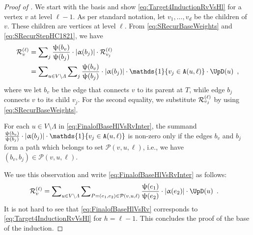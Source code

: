 \documentclass[11pt,reqno]{amsart}
\numberwithin{equation}{section}
\newcommand{\cP}{{\mathcal{P}}}
\newcommand{\applegreen}[1]{ {\color{applegreen}#1}}
\newcommand{\blue}[1]{{\color{blue}#1}}
\newcommand{\cadmiumorange}[1]{{\color{cadmiumorange}#1}}
\newcommand{\coquelicot}[1]{{\color{coquelicot}#1}}
\newcommand{\deeppink}[1]{{\color{deeppink}#1}}
\newcommand{\electricviolet}[1]{{\color{electricviolet}#1}}
\newcommand{\goldenbrown}[1]{{\color{goldenbrown}#1}}
\newcommand{\red}[1]{{\color{red}#1}}
\newcommand{\Ind}{\mathds{1}}
\newcommand{\cp}{{\tt A}}
\newcommand{\abs}[1]{\blue{|}#1\blue{|}}
\renewcommand{\applegreen}[1]{#1}
\renewcommand{\blue}[1]{#1}
\renewcommand{\cadmiumorange}[1]{#1}
\renewcommand{\coquelicot}[1]{#1}
\renewcommand{\deeppink}[1]{#1}
\renewcommand{\electricviolet}[1]{#1}
\renewcommand{\goldenbrown}[1]{#1}
\renewcommand{\red}[1]{#1}
\newcommand{\kb}{\deeppink{b}}
\newcommand{\ke}{\blue{e}}
\newcommand{\kh}{\cadmiumorange{h}}
\newcommand{\kj}{\coquelicot{j}}
\newcommand{\kell}{{\color{green(pigment)}\ell}}%
\newcommand{\kP}{\goldenbrown{P}}
\newcommand{\ku}{\red{u}}
\newcommand{\kv}{\electricviolet{v}}
\renewcommand{\kb}{b}
\renewcommand{\ke}{e}
\renewcommand{\kh}{h}
\renewcommand{\kj}{j}
\renewcommand{\kell}{\ell}
\renewcommand{\kP}{P}
\renewcommand{\ku}{u}
\renewcommand{\kv}{v}
\newcommand{\infweight}{\upalpha}
\begin{document}
\begin{proof}[Proof of ]
We start with the basis and show \eqref{eq:Target4InductionRvVsHl} for a vertex $\kv$
at level $\kell-1$. 
%
As per standard notation, let   $\kv_1, \ldots, \kv_d$ be the children of  $\kv$. These children are vertices at level $\kell$.
%
From \eqref{eq:SRecurBaseWeights} and \eqref{eq:SRecurStepHC1821}, we have 
\begin{align}
\subcont_{\kv} &= \sum\nolimits_{\kj}\frac{\chiofh(\kb_{\kv} )}{\chiofh(\kb_{\kj})}\cdot \abs{ \infweight(\kb_{\kj})} \cdot \subcont_{\kv_{\kj}} \nonumber\\
&=\sum\nolimits_{\ku \in V\setminus \Lambda} \sum\nolimits_{\kj}\frac{\chiofh(\kb_{\kv} )}{\chiofh(\kb_{\kj})}\cdot \abs{ \infweight(\kb_{\kj})} \cdot 
\Ind\{\kv_{\kj} \in \cp (\ku,\kell )\}\cdot \UpD(\ku) \enspace, \label{eq:FinalofBaseHlVsRvInter}
\end{align}
where we let $\kb_{\kv}$ be the edge that connects $\kv$ to its parent at $T$, while edge $\kb_{\kj}$ connects
$\kv$ to its child $\kv_{\kj}$. For the second equality, we substitute $\subcont_{\kv_{\kj}}$ by using \eqref{eq:SRecurBaseWeights}.
 



For each $\ku \in V\setminus \Lambda$ in \eqref{eq:FinalofBaseHlVsRvInter}, 
the summand $\frac{\chiofh(\kb_{\kv} )}{\chiofh(\kb_{\kj})}\cdot \abs{\infweight(\kb_{\kj})} \cdot 
\Ind\{\kv_{\kj} \in \cp (\ku,\kell )\}$ is non-zero only if the edges $\kb_{\kv}$ and $\kb_{\kj}$ 
 form a path which belongs to set $\cP(\kv,\ku,\kell)$, i.e., we have
$(\kb_{\kv},\kb_{\kj})\in \cP(\kv,\ku,\kell)$. 



We use this observation and write \eqref{eq:FinalofBaseHlVsRvInter} as follows:
\begin{align}
\subcont_{\kv}&=\sum\nolimits_{\ku \in V\setminus \Lambda} \sum\nolimits_{\kP=(\ke_1,\ke_2) \in \cP(\kv, \ku, \kell)}
\frac{\chiofh(\ke_{1}) }{\chiofh(\ke_2)} \cdot \abs{\infweight(\ke_2)}  \cdot \UpD(\ku) \enspace. 
\label{eq:FinalofBaseHlVsRv}
\end{align}
It is not hard to see that  \eqref{eq:FinalofBaseHlVsRv}  corresponds to \eqref{eq:Target4InductionRvVsHl} 
for $\kh=\kell-1$. This concludes the proof of the  base of the induction. 
%



\end{proof}
\end{document}
